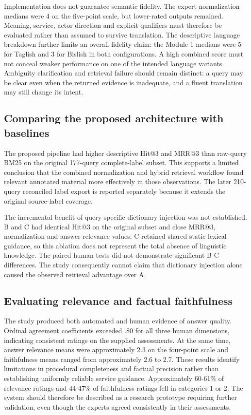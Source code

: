 Implementation does not guarantee semantic fidelity. The expert normalization medians were 4 on the five-point scale, but lower-rated outputs remained. Meaning, service, actor direction and explicit qualifiers must therefore be evaluated rather than assumed to survive translation. The descriptive language breakdown further limits an overall fidelity claim: the Module 1 medians were 5 for Taglish and 3 for Bislish in both configurations. A high combined score must not conceal weaker performance on one of the intended language variants. Ambiguity clarification and retrieval failure should remain distinct: a query may be clear even when the returned evidence is inadequate, and a fluent translation may still change its intent.


\subsection{Comparing the proposed architecture with baselines}

The proposed pipeline had higher descriptive Hit@3 and MRR@3 than raw-query BM25 on the original 177-query complete-label subset. This supports a limited conclusion that the combined normalization and hybrid retrieval workflow found relevant annotated material more effectively in those observations. The later 210-query reconciled label export is reported separately because it extends the original source-label coverage.


The incremental benefit of query-specific dictionary injection was not established. B and C had identical Hit@3 on the original subset and close MRR@3, normalization and answer relevance values. C retained shared static lexical guidance, so this ablation does not represent the total absence of linguistic knowledge. The paired human tests did not demonstrate significant B-C differences. The study consequently cannot claim that dictionary injection alone caused the observed retrieval advantage over A.


\subsection{Evaluating relevance and factual faithfulness}

The study produced both automated and human evidence of answer quality. Ordinal agreement coefficients exceeded .80 for all three human dimensions, indicating consistent ratings on the supplied assessments. At the same time, answer relevance means were approximately 2.3 on the four-point scale and faithfulness means ranged from approximately 2.6 to 2.7. These results identify limitations in procedural completeness and factual precision rather than establishing uniformly reliable service guidance. Approximately 60-61\% of relevance ratings and 44-47\% of faithfulness ratings fell in categories 1 or 2. The system should therefore be described as a research prototype requiring further validation, even though the experts agreed consistently in their assessments.


